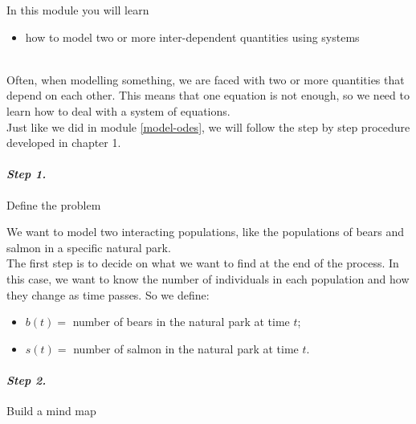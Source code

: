 In this module you will learn
\begin{itemize}
	\item how to model two or more inter-dependent quantities using systems
\end{itemize}

\hfill \\


Often, when modelling something, we are faced with two or more quantities that depend on each other. This means that one equation is not enough, so we need to learn how to deal with a system of equations. \\


Just like we did in module \ref{model-odes}, we will follow the step by step procedure developed in chapter 1.

\paragraph{\emph{Step 1.}} Define the problem

\begin{example}
We want to model two interacting populations, like the populations of bears and salmon in a specific natural park.\\

The first step is to decide on what we want to find at the end of the process. 
In this case, we want to know the number of individuals in each population and how they change as time passes. So we define:
\begin{itemize}
	\item $b(t) =$ number of bears in the natural park at time $t$;
	\item $s(t) =$ number of salmon in the natural park at time $t$.
\end{itemize}
\end{example}


\paragraph{\emph{Step 2.}} Build a mind map

